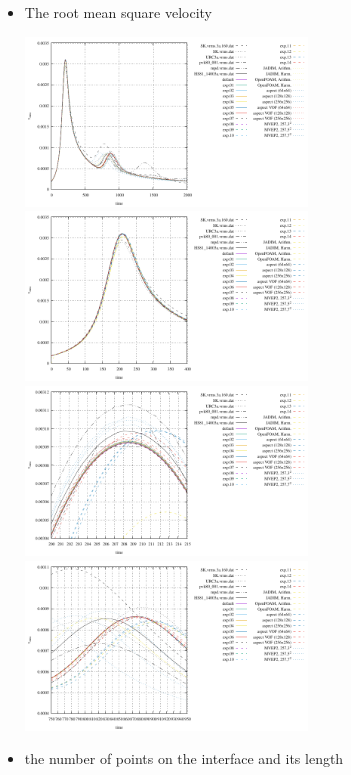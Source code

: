 \begin{itemize}
\item The root mean square velocity

\begin{center}
\includegraphics[width=7.5cm]{python_codes/fieldstone_95/results/vrms2000}
\includegraphics[width=7.5cm]{python_codes/fieldstone_95/results/vrms400}\\
\includegraphics[width=7.5cm]{python_codes/fieldstone_95/results/vrms_peak1}
\includegraphics[width=7.5cm]{python_codes/fieldstone_95/results/vrms_peak2}\\
\end{center}

\item the number of points on the interface
and its length 


\end{itemize}
